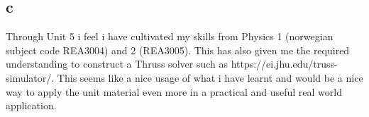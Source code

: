 \documentclass{article}
\begin{document}
\subsection{c}

Through Unit 5 i feel i have cultivated my skills from Physics 1 (norwegian subject code REA3004) and 2 (REA3005). This has also given me the required understanding to construct a Thruss solver such as https://ei.jhu.edu/truss-simulator/. This seems like a nice usage of what i have learnt and would be a nice way to apply the unit material even more in a practical and useful real world application.






\end{document}
